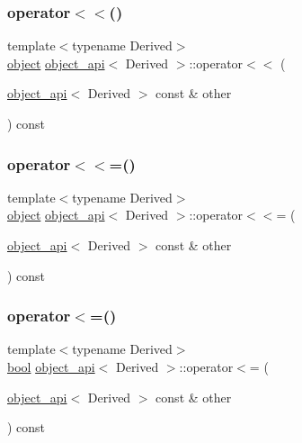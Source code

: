 \mbox{\label{classobject__api_a497229c4f1c3842eba6ceeddbfb5dca7}} 
\subsubsection{\texorpdfstring{operator$<$$<$()}{operator<<()}}
{\footnotesize\ttfamily template$<$typename Derived$>$ \\
\mbox{\hyperlink{classobject}{object}} \mbox{\hyperlink{classobject__api}{object\+\_\+api}}$<$ Derived $>$\+::operator$<$$<$ (\begin{DoxyParamCaption}\item[{\mbox{\hyperlink{classobject__api}{object\+\_\+api}}$<$ Derived $>$ const \&}]{other }\end{DoxyParamCaption}) const}

\mbox{\label{classobject__api_a68ca4903ae971465b87c148e9e4a4bed}} 
\subsubsection{\texorpdfstring{operator$<$$<$=()}{operator<<=()}}
{\footnotesize\ttfamily template$<$typename Derived$>$ \\
\mbox{\hyperlink{classobject}{object}} \mbox{\hyperlink{classobject__api}{object\+\_\+api}}$<$ Derived $>$\+::operator$<$$<$= (\begin{DoxyParamCaption}\item[{\mbox{\hyperlink{classobject__api}{object\+\_\+api}}$<$ Derived $>$ const \&}]{other }\end{DoxyParamCaption}) const}

\mbox{\label{classobject__api_a04fe4d81ee95c83ba2eb0f25220b9881}} 
\subsubsection{\texorpdfstring{operator$<$=()}{operator<=()}}
{\footnotesize\ttfamily template$<$typename Derived$>$ \\
\mbox{\hyperlink{asdl_8h_af6a258d8f3ee5206d682d799316314b1}{bool}} \mbox{\hyperlink{classobject__api}{object\+\_\+api}}$<$ Derived $>$\+::operator$<$= (\begin{DoxyParamCaption}\item[{\mbox{\hyperlink{classobject__api}{object\+\_\+api}}$<$ Derived $>$ const \&}]{other }\end{DoxyParamCaption}) const\hspace{0.3cm}{\ttfamily [inline]}}

